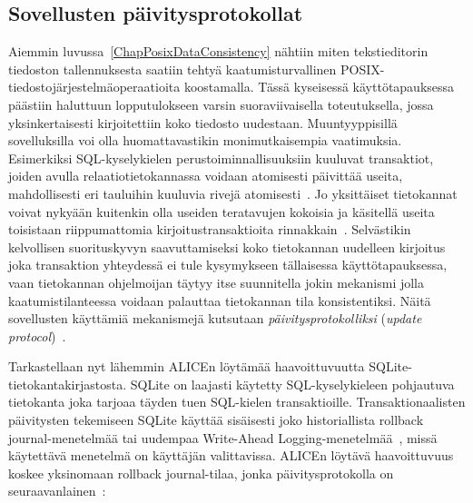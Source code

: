 \subsection{Sovellusten päivitysprotokollat}

Aiemmin luvussa~\ref{ChapPosixDataConsistency} nähtiin miten tekstieditorin tiedoston tallennuksesta saatiin tehtyä kaatumisturvallinen POSIX-tiedostojärjestelmäoperaatioita koostamalla.
Tässä kyseisessä käyttötapauksessa päästiin haluttuun lopputulokseen varsin suoraviivaisella toteutuksella, jossa yksinkertaisesti kirjoitettiin koko tiedosto uudestaan.
Muuntyyppisillä sovelluksilla voi olla huomattavastikin monimutkaisempia vaatimuksia.
Esimerkiksi SQL-kyselykielen perustoiminnallisuuksiin kuuluvat transaktiot,
joiden avulla relaatiotietokannassa voidaan atomisesti päivittää useita, mahdollisesti eri tauluihin kuuluvia rivejä atomisesti~\cite{DatabaseFundamentals}.
Jo yksittäiset tietokannat voivat nykyään kuitenkin olla useiden teratavujen kokoisia ja käsitellä useita toisistaan riippumattomia kirjoitustransaktioita rinnakkain~\cite{DatabaseFundamentals}.
Selvästikin kelvollisen suorituskyvyn saavuttamiseksi koko tietokannan uudelleen kirjoitus joka transaktion yhteydessä ei tule kysymykseen tällaisessa käyttötapauksessa,
vaan tietokannan ohjelmoijan täytyy itse suunnitella jokin mekanismi jolla kaatumistilanteessa voidaan palauttaa tietokannan tila konsistentiksi.
Näitä sovellusten käyttämiä mekanismejä kutsutaan \emph{päivitysprotokolliksi} (\emph{update protocol})~\cite{PosixDataConsistency}.

Tarkastellaan nyt lähemmin ALICEn löytämää haavoittuvuutta SQLite-tietokantakirjastosta.
SQLite on laajasti käytetty SQL-kyselykieleen pohjautuva tietokanta joka tarjoaa täyden tuen SQL-kielen transaktioille.
Transaktionaalisten päivitysten tekemiseen SQLite käyttää sisäisesti joko historiallista rollback journal-menetelmää tai uudempaa Write-Ahead Logging-menetelmää~\cite{SqliteAnalysis},
missä käytettävä menetelmä on käyttäjän valittavissa.
ALICEn löytävä haavoittuvuus koskee yksinomaan rollback journal-tilaa,
jonka päivitysprotokolla on seuraavanlainen~\cite{PosixDataConsistency}:

